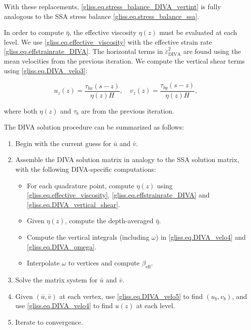 {\noindent
With these replacements, \eqref{gliss.eq.stress_balance_DIVA_vertint} is fully analogous 
to the SSA stress balance \eqref{gliss.eq.stress_balance_ssa}.

In order to compute $\bar{\eta}$, the effective viscosity $\eta(z)$ must be evaluated at each level.
We use \eqref{gliss.eq.effective_viscosity} with the effective strain rate
\eqref{gliss.eq.effstrainrate_DIVA}. The horizontal terms in 
$\dot{\varepsilon }_{\text{DIVA}}^2$ are found using the mean velocities from the previous iteration.
We compute the vertical shear terms using \eqref{gliss.eq.DIVA_velo3}:

\begin{equation}
  \label{gliss.eq.DIVA_vertical_shear}
  {{u}_{z}}(z) = \frac{{{\tau }_{bx}}(s-z)}{\eta(z) H}, \quad 
  {{v}_{z}}(z) = \frac{{{\tau }_{by}}(s-z)}{\eta(z) H},
\end{equation}

\noindent
where both $\eta(z)$ and $\tau_b$ are from the previous iteration.

The DIVA solution procedure can be summarized as follows:

\begin{enumerate}
\item Begin with the current guess for $\bar{u}$ and $\bar{v}$.
\item Assemble the DIVA solution matrix in analogy to the SSA solution matrix,
  with the following DIVA-specific computations:
  \begin{itemize}
    \item For each quadrature point, compute $\eta(z)$ using \eqref{gliss.eq.effective_viscosity},
      \eqref{gliss.eq.effstrainrate_DIVA} and \eqref{gliss.eq.DIVA_vertical_shear}.
    \item Given $\eta(z)$, compute the depth-averaged $\bar{\eta}$.
    \item Compute the vertical integrals (including $\omega$) in \eqref{gliss.eq.DIVA_velo4} 
      and \eqref{gliss.eq.DIVA_omega}.
    \item Interpolate $\omega$ to vertices and compute $\beta_\text{eff}$.
\end{itemize} 
\item Solve the matrix system for $\bar{u}$ and $\bar{v}$.
\item Given $(\bar{u}, \bar{v})$ at each vertex, use \eqref{gliss.eq.DIVA_velo5} to find $(u_b, v_b)$,
  and use \eqref{gliss.eq.DIVA_velo4} to find $u(z)$ at each level.
\item Iterate to convergence.
\end{enumerate}

}
